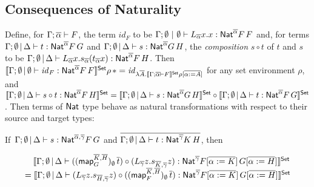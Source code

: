 \documentclass[runningheads]{llncs}
\renewcommand{\id}{\mathit{id}}
\newcommand{\map}{\mathsf{map}}
\renewcommand{\id}{\mathit{id}}
\begin{document}
\vspace*{-0.1in}

\subsection{Consequences of Naturality}\label{sec:Nat-type-terms}   

\vspace*{-0.1in}

Define, for $\Gamma; \overline{\alpha} \vdash F$, the term $\id_F$ to be
$\Gamma;\emptyset~|~\emptyset \vdash L_{\overline{\alpha}}x.x :
\mathsf{Nat}^{\overline{\alpha}} F\,F$ and, for terms $\Gamma; \emptyset \,|\,
\Delta \vdash t: \mathsf{Nat}^{\overline{\alpha}} F\,G$ and $\Gamma; \emptyset
\,|\, \Delta \vdash s: \mathsf{Nat}^{\overline{\alpha}} G\,H$, the {\em
  composition} $s \circ t$ of $t$ and $s$ to be $\Gamma;
\emptyset\,|\, \Delta \vdash L_{\overline{\alpha}}
x. s_{\overline{\alpha}}(t_{\overline{\alpha}}x):
\mathsf{Nat}^{\overline{\alpha}} F\,H$. Then $\setsem{\Gamma; \emptyset \,|\,
  \emptyset \vdash \id_{F} : \Nat^{\ol{\alpha}} F\,F} \rho\, \ast =
\id_{\lambda \ol{A}. \setsem{\Gamma; \ol{\alpha} \vdash F} \rho
  [\ol{\alpha := A}]}$ for any set environment $\rho$, and
$\llbracket{\Gamma; \emptyset \,|\, \Delta \vdash s \circ t:
  \mathsf{Nat}^{\overline{\alpha}} F\,H}\rrbracket^{\mathsf{Set}}\\ = \llbracket{\Gamma; \emptyset \,|\,
  \Delta \vdash s: \mathsf{Nat}^{\overline{\alpha}} G\,H}\rrbracket^{\mathsf{Set}} \circ 
\llbracket{\Gamma; \emptyset \,|\, \Delta \vdash t:
  \mathsf{Nat}^{\overline{\alpha}} F\,G}\rrbracket^{\mathsf{Set}}$.  Then terms of $\mathsf{Nat}$ type behave
as natural transformations with respect to their source and target
types:

  \vspace*{-0.05in}

\begin{theorem}\label{eq:ft-from-nat} 
  If\, $\Gamma; \emptyset \,|\, \Delta \vdash s : \mathsf{Nat}^{\overline{\alpha},
  \overline{\gamma}} F\,G$ and $\overline{\Gamma; \emptyset \,|\,
  \Delta \vdash t : \mathsf{Nat}^{\overline{\gamma}} K\, H}$, then

    \vspace*{-0.25in}
  
  \[\begin{array}{l}
  \hspace*{0.135in}
\setsem{\Gamma; \emptyset\,|\, \Delta
  \vdash 
  ((\map_G^{\overline{K}, \overline{H}})_\emptyset \,\overline{t}) \circ
(L_{\overline{\gamma}} z. s_{\overline{K}, \overline{\gamma}}
  z)
  : \Nat^{\overline{\gamma}} F[\overline{\alpha := K}]\,
  G[\overline{\alpha := H}]}\\
= \setsem{ \Gamma; \emptyset \,|\, \Delta \vdash
(L_{\overline{\gamma}} z.
  s_{\overline{H}, \overline{\gamma}} z)\circ
  ((\map_F^{\overline{K}, \overline{H}})_\emptyset \,
  \overline{t})  : \Nat^{\overline{\gamma}} F[\overline{\alpha :=
      K}]\, G[\overline{\alpha := H}]}
\end{array}\]
\end{theorem}
\end{document}
